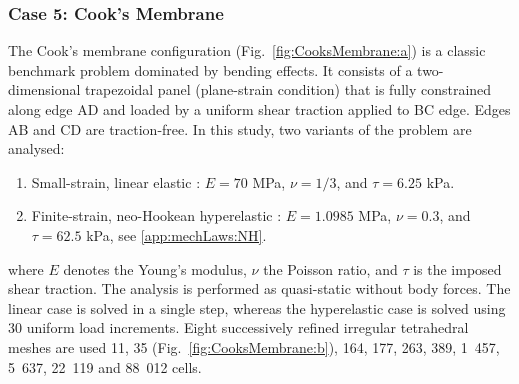 \documentclass[review,3p]{elsarticle}
\begin{document}
\subsubsection{Case 5: Cook's Membrane}
\label{case:cooks_membrane}
%
The Cook’s membrane configuration (Fig.~\ref{fig:CooksMembrane:a}) is a classic benchmark problem dominated by bending effects.
It consists of a two-dimensional trapezoidal panel (plane-strain condition) that is fully constrained along edge AD and loaded by a uniform shear traction applied to BC edge. Edges AB and CD are traction-free.
In this study, two variants of the problem are analysed:
\vspace{0.5em}
\begin{enumerate}
	\item[i.] Small-strain, linear elastic \cite{Zienkiewicz2000,Simplas}: $E = 70$ MPa, $\nu = 1/3$, and $\tau = 6.25$ kPa.
	\item[ii.] Finite-strain, neo-Hookean hyperelastic \cite{Pelteret2018}: $E = 1.0985$ MPa, $\nu = 0.3$, and $\tau = 62.5$ kPa, see \ref{app:mechLaws:NH}.
\end{enumerate}
\vspace{0.5em}
\noindent
where $E$ denotes the Young’s modulus, $\nu$ the Poisson ratio, and $\tau$ is the imposed shear traction.
The analysis is performed as quasi-static without body forces.
The linear case is solved in a single step, whereas the hyperelastic case is solved using 30 uniform load increments.
Eight successively refined irregular tetrahedral meshes are used 11, 35 (Fig.~\ref{fig:CooksMembrane:b}), 164, 177, 263, 389, 1~457, 5~637, 22~119 and 88~012 cells.
\end{document}
